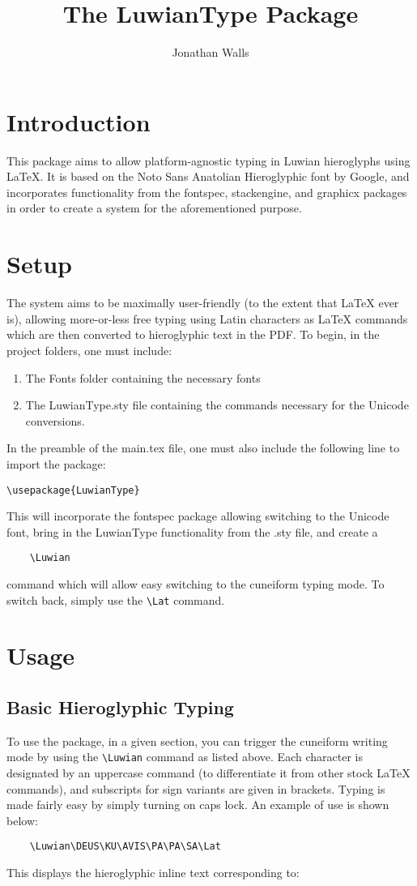\documentclass[12pt,A4]{article}
\title{The LuwianType Package}
\author{Jonathan Walls}
\begin{document}
\maketitle

\section{Introduction}

This package aims to allow platform-agnostic typing in Luwian hieroglyphs using LaTeX. It is based on the Noto Sans Anatolian Hieroglyphic font by Google, and incorporates functionality from the fontspec, stackengine, and graphicx packages in order to create a system for the aforementioned purpose.

\section{Setup}
The system aims to be maximally user-friendly (to the extent that LaTeX ever is), allowing more-or-less free typing using Latin characters as LaTeX commands which are then converted to hieroglyphic text in the PDF. To begin, in the project folders, one must include:
\begin{enumerate}
    \item The Fonts folder containing the necessary fonts
    \item The LuwianType.sty file containing the commands necessary for the Unicode conversions.
\end{enumerate}

In the preamble of the main.tex file, one must also include the following line to import the package:\small
\begin{verbatim}
\usepackage{LuwianType}
\end{verbatim}
\normalsize\newpage
This will incorporate the fontspec package allowing switching to the Unicode font, bring in the LuwianType functionality from the .sty file, and create a 
\begin{verbatim}
    \Luwian
\end{verbatim} 
command which will allow easy switching to the cuneiform typing mode. To switch back, simply use the \verb|\Lat| command.

\section{Usage}
\subsection{Basic Hieroglyphic Typing}
To use the package, in a given section, you can trigger the cuneiform writing mode by using the \verb|\Luwian| command as listed above. Each character is designated by an uppercase command (to differentiate it from other stock LaTeX commands), and subscripts for sign variants are given in brackets. Typing is made fairly easy by simply turning on caps lock. An example of use is shown below:
\begin{verbatim}
    \Luwian\DEUS\KU\AVIS\PA\PA\SA\Lat
\end{verbatim}
This displays the hieroglyphic inline text corresponding to: 
\\
\end{document}
